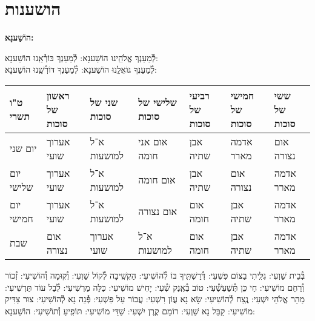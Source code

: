 \documentclass[twoside, openany, parskip=half, 11pt]{book}
\begin{document}
\sepline





\chapter[הושענות]{ הושענות }
\label{hoshanos}


\begin{Large}
\textbf{
הוֹשַׁענָא:
}
\end{Large}


לְ֯מַעַנְךָ אֱלֹהֵֽינוּ הוֹשַׁענָא: לְ֯מַעַנְךָ בּוֹרְ֯אֵֽנוּ הוֹשַׁענָא:\\
לְ֯מַעַנְךָ גּוֹאֲלֵֽנוּ הוֹשַׁענָא: לְ֯מַעַנְךָ דּוֹרְ֯שֵֽׁנוּ הוֹשַׁענָא:

\begin{tiny}
\begin{tabular}{>{\centering\arraybackslash}m{}||>{\centering\arraybackslash}m{}|>{\centering\arraybackslash}m{}|>{\centering\arraybackslash}m{}|>{\centering\arraybackslash}m{}|>{\centering\arraybackslash}m{}|>{\centering\arraybackslash}m{}}
ט"ו תשרי & ראשון של סוכות & שני של סוכות & שלישי של סוכות & רביעי של סוכות & חמישי של סוכות & ששי של סוכות \\
\hline \hline
יום שני & אערוך שועי & א־ל למושעות & אום אני חומה & אבן שתיה & אדמה מארר & אום נצורה\\ \hline
יום שלישי & אערוך שועי & א־ל למושעות & אום חומה & אבן שתיה & אום נצורה & אדמה מארר \\ \hline
יום חמישי & אערוך שועי & א־ל למושעות & אום נצורה & אום חומה & אבן שתיה & אדמה מארר\\ \hline
שבת & אום נצורה & אערוך שועי & א־ל למושעות & אום חומה & אבן שתיה & אדמה מארר
\end{tabular}

\end{tiny}


בְּ֯בֵית שַׁוְעִי: גִּלִּֽיתִי בַצּוֹם פִּשְׁעִי: דְּ֯רַשְׁתִּֽיךָ בּוֹ לְ֯הוֹשִׁיעִי: הַקְשִֽׁיבָה לְ֯קוֹל שַׁוְעִי: וְ֯קֽוּמָה וְ֯הוֹשִׁיעִי: זְ֯כוֹר וְ֯רַחֵם מוֹשִׁיעִי: חַי כֵּן תְּ֯שַׁעְשְׁ֯עִי: טוֹב בְּ֯אֶֽנֶק שְׁ֯עִי: יָחִישׁ מוֹשִׁיעִי: כַּלֵּה מַרְשִׁיעִי: לְ֯בַל עוֹד תַּרְשִׁיעִי: מַהֵר אֱלֹהֵי יִשְׁעִי: נֶֽצַח לְ֯הוֹשִׁיעִי: שָׂא נָא עֲוֹן רִשְׁעִי: עֲבוֹר עַל פִּשְׁעִי: פְּ֯נֵה נָא לְ֯הוֹשִׁיעִי: צוּר צַדִּיק מוֹשִׁיעִי: קַבֵּל נָא שַׁוְעִי: רוֹמֵם קֶֽרֶן יִשְׁעִי:
שַׁדַּי מוֹשִׁיעִי: תּוֹפִֽיעַ וְ֯תוֹשִׁיעִי: הוֹשַׁענָא:

\end{document}
